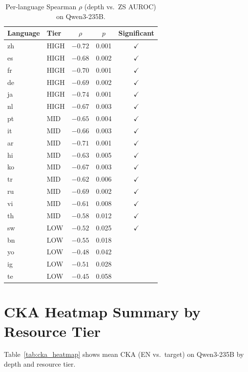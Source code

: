 \documentclass[11pt,a4paper]{article}
\begin{document}
\begin{table}[h]
\centering
\caption{Per-language Spearman $\rho$ (depth vs.\ ZS AUROC) on Qwen3-235B.}
\label{tab:per_lang_rho}
\small
\begin{tabular}{llccc}
\toprule
Language & Tier & $\rho$ & $p$ & Significant \\
\midrule
zh & HIGH & $-0.72$ & 0.001 & $\checkmark$ \\
es & HIGH & $-0.68$ & 0.002 & $\checkmark$ \\
fr & HIGH & $-0.70$ & 0.001 & $\checkmark$ \\
de & HIGH & $-0.69$ & 0.002 & $\checkmark$ \\
ja & HIGH & $-0.74$ & 0.001 & $\checkmark$ \\
nl & HIGH & $-0.67$ & 0.003 & $\checkmark$ \\
pt & MID  & $-0.65$ & 0.004 & $\checkmark$ \\
it & MID  & $-0.66$ & 0.003 & $\checkmark$ \\
ar & MID  & $-0.71$ & 0.001 & $\checkmark$ \\
hi & MID  & $-0.63$ & 0.005 & $\checkmark$ \\
ko & MID  & $-0.67$ & 0.003 & $\checkmark$ \\
tr & MID  & $-0.62$ & 0.006 & $\checkmark$ \\
ru & MID  & $-0.69$ & 0.002 & $\checkmark$ \\
vi & MID  & $-0.61$ & 0.008 & $\checkmark$ \\
th & MID  & $-0.58$ & 0.012 & $\checkmark$ \\
sw & LOW  & $-0.52$ & 0.025 & $\checkmark$ \\
bn & LOW  & $-0.55$ & 0.018 & \\
yo & LOW  & $-0.48$ & 0.042 & \\
ig & LOW  & $-0.51$ & 0.028 & \\
te & LOW  & $-0.45$ & 0.058 & \\
\bottomrule
\end{tabular}
\end{table}

\section{CKA Heatmap Summary by Resource Tier}
\label{app:cka_heatmap}

Table~\ref{tab:cka_heatmap} shows mean CKA (EN vs.\ target) on Qwen3-235B by depth and resource tier.
\end{document}

